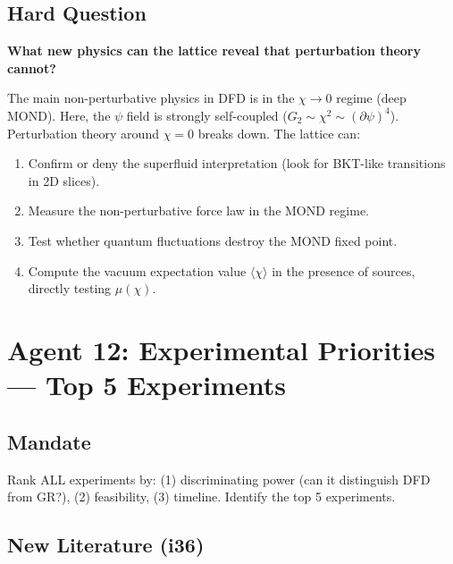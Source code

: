 \documentclass[11pt,a4paper]{article}
\begin{document}
\subsection{Hard Question}

\textbf{What new physics can the lattice reveal that perturbation theory cannot?}

The main non-perturbative physics in DFD is in the $\chi \to 0$ regime (deep MOND). Here, the $\psi$ field is strongly self-coupled ($G_2 \sim \chi^2 \sim (\partial\psi)^4$). Perturbation theory around $\chi = 0$ breaks down. The lattice can:
\begin{enumerate}
\item Confirm or deny the superfluid interpretation (look for BKT-like transitions in 2D slices).
\item Measure the non-perturbative force law in the MOND regime.
\item Test whether quantum fluctuations destroy the MOND fixed point.
\item Compute the vacuum expectation value $\langle\chi\rangle$ in the presence of sources, directly testing $\mu(\chi)$.
\end{enumerate}

\newpage
\section{Agent 12: Experimental Priorities --- Top 5 Experiments}
\label{sec:agent12}

\subsection{Mandate}

Rank ALL experiments by: (1) discriminating power (can it distinguish DFD from GR?), (2) feasibility, (3) timeline. Identify the top 5 experiments.

\subsection{New Literature (i36)}
\end{document}
